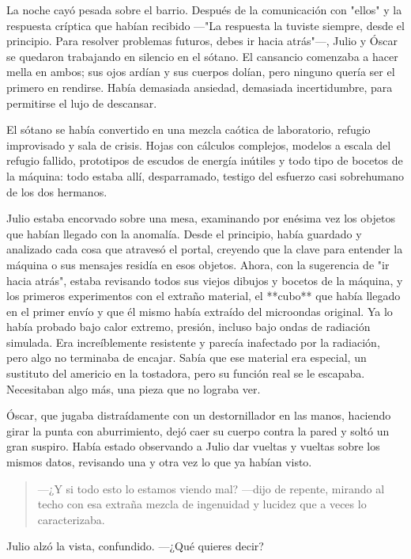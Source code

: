 \documentclass[a4paper,12pt]{book}
\begin{document}
La noche cayó pesada sobre el barrio. Después de la comunicación con "ellos" y la respuesta críptica que habían recibido —"La respuesta la tuviste siempre, desde el principio. Para resolver problemas futuros, debes ir hacia atrás"—, Julio y Óscar se quedaron trabajando en silencio en el sótano. El cansancio comenzaba a hacer mella en ambos; sus ojos ardían y sus cuerpos dolían, pero ninguno quería ser el primero en rendirse. Había demasiada ansiedad, demasiada incertidumbre, para permitirse el lujo de descansar.

El sótano se había convertido en una mezcla caótica de laboratorio, refugio improvisado y sala de crisis. Hojas con cálculos complejos, modelos a escala del refugio fallido, prototipos de escudos de energía inútiles y todo tipo de bocetos de la máquina: todo estaba allí, desparramado, testigo del esfuerzo casi sobrehumano de los dos hermanos.

Julio estaba encorvado sobre una mesa, examinando por enésima vez los objetos que habían llegado con la anomalía. Desde el principio, había guardado y analizado cada cosa que atravesó el portal, creyendo que la clave para entender la máquina o sus mensajes residía en esos objetos. Ahora, con la sugerencia de "ir hacia atrás", estaba revisando todos sus viejos dibujos y bocetos de la máquina, y los primeros experimentos con el extraño material, el **cubo** que había llegado en el primer envío y que él mismo había extraído del microondas original. Ya lo había probado bajo calor extremo, presión, incluso bajo ondas de radiación simulada. Era increíblemente resistente y parecía inafectado por la radiación, pero algo no terminaba de encajar. Sabía que ese material era especial, un sustituto del americio en la tostadora, pero su función real se le escapaba. Necesitaban algo más, una pieza que no lograba ver.

Óscar, que jugaba distraídamente con un destornillador en las manos, haciendo girar la punta con aburrimiento, dejó caer su cuerpo contra la pared y soltó un gran suspiro. Había estado observando a Julio dar vueltas y vueltas sobre los mismos datos, revisando una y otra vez lo que ya habían visto.

\begin{quote}
    —¿Y si todo esto lo estamos viendo mal? —dijo de repente, mirando al techo con esa extraña mezcla de ingenuidad y lucidez que a veces lo caracterizaba.
\end{quote}

Julio alzó la vista, confundido. —¿Qué quieres decir?
\end{document}
